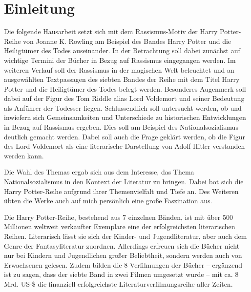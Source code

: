 \section{Einleitung} 
Die folgende Hausarbeit setzt sich mit dem Rassismus-Motiv der \glqq Harry Potter\grqq{}-Reihe von Joanne K. Rowling am Beispiel des Bandes \glqq Harry Potter und die Heiligtümer des Todes\grqq{} auseinander.
In der Betrachtung soll dabei zunächst auf wichtige Termini der Bücher in Bezug auf Rassismus eingegangen werden. 
Im weiteren Verlauf soll der Rassismus in der magischen Welt beleuchtet und an ausgewählten Textpassagen des siebten Bandes der Reihe mit dem Titel \glqq Harry Potter und die Heiligtümer des Todes\grqq{} belegt werden. 
Besonderes Augenmerk soll dabei auf der Figur des Tom Riddle alias Lord Voldemort und seiner Bedeutung als Anführer der Todesser liegen.
Schlussendlich soll untersucht werden, ob und inwiefern sich Gemeinsamkeiten und Unterschiede zu historischen Entwicklungen in Bezug auf Rassismus ergeben. 
Dies soll am Beispiel des Nationalsozialismus deutlich gemacht werden. 
Dabei soll auch die Frage geklärt werden, ob die Figur des Lord Voldemort als eine literarische Darstellung von Adolf Hitler verstanden werden kann. 

Die Wahl des Themas ergab sich aus dem Interesse, das Thema \glqq Nationalsozialismus\grqq{} in den Kontext der Literatur zu bringen. 
Dabei bot sich die \glqq Harry Potter\grqq-Reihe aufgrund ihrer Themenvielfalt und Tiefe an. 
Des Weiteren übten die Werke auch auf mich persönlich eine große Faszination aus. 

Die \glqq Harry Potter\grqq-Reihe, bestehend aus 7 einzelnen Bänden, ist mit über 500 Millionen weltweit verkaufter Exemplare eine der erfolgreichsten literarischen Reihen. 
Literarisch lässt sie sich der Kinder- und Jugendliteratur, aber auch dem Genre der Fantasyliteratur zuordnen. 
Allerdings erfreuen sich die Bücher nicht nur bei Kindern und Jugendlichen großer Beliebtheit, sondern werden auch von Erwachsenen gelesen.
 Zudem bilden die 8 Verfilmungen der Bücher – ergänzend ist zu sagen, dass der siebte Band in zwei Filmen umgesetzt wurde – mit ca. 8 Mrd. US-\$ die finanziell erfolgreichste Literaturverfilmungsreihe aller Zeiten.

